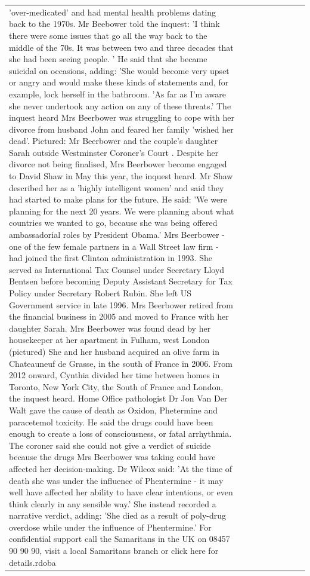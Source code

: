 \begin{table}[H]
\begin{tabular}{lllrlllll}
'over-medicated' and had mental health problems dating back to the 1970s. Mr Beebower told the inquest: 'I think there were some issues that go all the way back to the middle of the 70s. It was between two and three decades that she had been seeing people. ' He said that she became suicidal on occasions, adding: 'She would become very upset or angry and would make these kinds of statements and, for example, lock herself in the bathroom. 'As far as I'm aware she never undertook any action on any of these threats.' The inquest heard Mrs Beerbower was struggling to cope with her divorce from husband John and feared her family 'wished her dead'. Pictured: Mr Beerbower and the couple's daughter Sarah outside Westminster Coroner's Court . Despite her divorce not being finalised, Mrs Beerbower become engaged to David Shaw in May this year, the inquest heard. Mr Shaw described her as a 'highly intelligent women' and said they had started to make plans for the future. He said: 'We were planning for the next 20 years. We were planning about what countries we wanted to go, because she was being offered ambassadorial roles by President Obama.' Mrs Beerbower - one of the few female partners in a Wall Street law firm - had joined the first Clinton administration in 1993. She served as International Tax Counsel under Secretary Lloyd Bentsen before becoming Deputy Assistant Secretary for Tax Policy under Secretary Robert Rubin. She left US Government service in late 1996. Mrs Beerbower retired from the financial business in 2005 and moved to France with her daughter Sarah. Mrs Beerbower was found dead by her housekeeper at her apartment in Fulham, west London (pictured) She and her husband acquired an olive farm in Chateauneuf de Grasse, in the south of France in 2006. From 2012 onward, Cynthia divided her time between homes in Toronto, New York City, the South of France and London, the inquest heard. Home Office pathologist Dr Jon Van Der Walt gave the cause of death as Oxidon, Phetermine and paracetemol toxicity. He said the drugs could have been enough to create a loss of consciousness, or fatal arrhythmia. The coroner said she could not give a verdict of suicide because the drugs Mrs Beerbower was taking could have affected her decision-making. Dr Wilcox said: 'At the time of death she was under the influence of Phentermine - it may well have affected her ability to have clear intentions, or even think clearly in any sensible way.' She instead recorded a narrative verdict, adding: 'She died as a result of poly-drug overdose while under the influence of Phentermine.' For confidential support call the Samaritans in the UK on 08457 90 90 90, visit a local Samaritans branch or click here for details.rdoba \\

\end{tabular}
\end{table}
